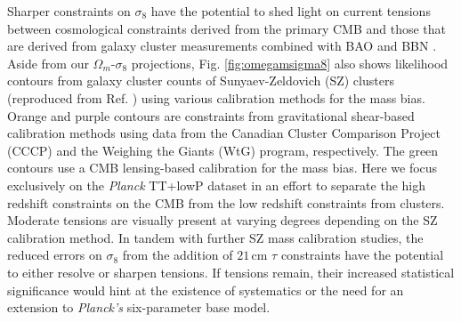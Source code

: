 \documentclass[twocolumn,aps,prd,nofootinbib,showpacs,superscriptaddress]{revtex4-1}
\begin{document}
Sharper constraints on $\sigma_8$ have the potential to shed light on current tensions between cosmological constraints derived from the primary CMB and those that are derived from galaxy cluster measurements combined with BAO and BBN \cite{Planck2015clusters}. Aside from our $\Omega_m$-$\sigma_8$ projections, Fig. \ref{fig:omegamsigma8} also shows likelihood contours from galaxy cluster counts of Sunyaev-Zeldovich (SZ) clusters (reproduced from Ref. \cite{Planck2015clusters}) using various calibration methods for the mass bias. Orange and purple contours are constraints from gravitational shear-based calibration methods using data from the Canadian Cluster Comparison Project (CCCP) and the Weighing the Giants (WtG) program, respectively. The green contours use a CMB lensing-based calibration for the mass bias. Here we focus exclusively on the \emph{Planck} TT+lowP dataset in an effort to separate the high redshift constraints on the CMB from the low redshift constraints from clusters. Moderate tensions are visually present at varying degrees depending on the SZ calibration method. In tandem with further SZ mass calibration studies, the reduced errors on $\sigma_8$ from the addition of $21\,\textrm{cm}$ $\tau$ constraints have the potential to either resolve or sharpen tensions. If tensions remain, their increased statistical significance would hint at the existence of systematics or the need for an extension to \emph{Planck's} six-parameter base model.
\end{document}
